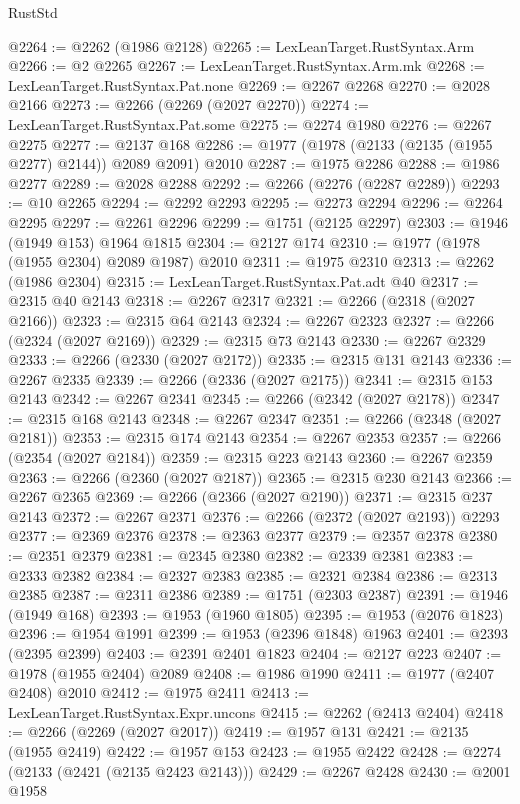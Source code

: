 \begin{lexlean}{RustStd}
\begin{coremodule}
@2264 := @2262 (@1986 @2128)
@2265 := LexLeanTarget.RustSyntax.Arm
@2266 := @2 @2265
@2267 := LexLeanTarget.RustSyntax.Arm.mk
@2268 := LexLeanTarget.RustSyntax.Pat.none
@2269 := @2267 @2268
@2270 := @2028 @2166
@2273 := @2266 (@2269 (@2027 @2270))
@2274 := LexLeanTarget.RustSyntax.Pat.some
@2275 := @2274 @1980
@2276 := @2267 @2275
@2277 := @2137 @168
@2286 := @1977 (@1978 (@2133 (@2135 (@1955 @2277) @2144)) @2089 @2091) @2010
@2287 := @1975 @2286
@2288 := @1986 @2277
@2289 := @2028 @2288
@2292 := @2266 (@2276 (@2287 @2289))
@2293 := @10 @2265
@2294 := @2292 @2293
@2295 := @2273 @2294
@2296 := @2264 @2295
@2297 := @2261 @2296
@2299 := @1751 (@2125 @2297)
@2303 := @1946 (@1949 @153) @1964 @1815
@2304 := @2127 @174
@2310 := @1977 (@1978 (@1955 @2304) @2089 @1987) @2010
@2311 := @1975 @2310
@2313 := @2262 (@1986 @2304)
@2315 := LexLeanTarget.RustSyntax.Pat.adt @40
@2317 := @2315 @40 @2143
@2318 := @2267 @2317
@2321 := @2266 (@2318 (@2027 @2166))
@2323 := @2315 @64 @2143
@2324 := @2267 @2323
@2327 := @2266 (@2324 (@2027 @2169))
@2329 := @2315 @73 @2143
@2330 := @2267 @2329
@2333 := @2266 (@2330 (@2027 @2172))
@2335 := @2315 @131 @2143
@2336 := @2267 @2335
@2339 := @2266 (@2336 (@2027 @2175))
@2341 := @2315 @153 @2143
@2342 := @2267 @2341
@2345 := @2266 (@2342 (@2027 @2178))
@2347 := @2315 @168 @2143
@2348 := @2267 @2347
@2351 := @2266 (@2348 (@2027 @2181))
@2353 := @2315 @174 @2143
@2354 := @2267 @2353
@2357 := @2266 (@2354 (@2027 @2184))
@2359 := @2315 @223 @2143
@2360 := @2267 @2359
@2363 := @2266 (@2360 (@2027 @2187))
@2365 := @2315 @230 @2143
@2366 := @2267 @2365
@2369 := @2266 (@2366 (@2027 @2190))
@2371 := @2315 @237 @2143
@2372 := @2267 @2371
@2376 := @2266 (@2372 (@2027 @2193)) @2293
@2377 := @2369 @2376
@2378 := @2363 @2377
@2379 := @2357 @2378
@2380 := @2351 @2379
@2381 := @2345 @2380
@2382 := @2339 @2381
@2383 := @2333 @2382
@2384 := @2327 @2383
@2385 := @2321 @2384
@2386 := @2313 @2385
@2387 := @2311 @2386
@2389 := @1751 (@2303 @2387)
@2391 := @1946 (@1949 @168)
@2393 := @1953 (@1960 @1805)
@2395 := @1953 (@2076 @1823)
@2396 := @1954 @1991
@2399 := @1953 (@2396 @1848) @1963
@2401 := @2393 (@2395 @2399)
@2403 := @2391 @2401 @1823
@2404 := @2127 @223
@2407 := @1978 (@1955 @2404) @2089
@2408 := @1986 @1990
@2411 := @1977 (@2407 @2408) @2010
@2412 := @1975 @2411
@2413 := LexLeanTarget.RustSyntax.Expr.uncons
@2415 := @2262 (@2413 @2404)
@2418 := @2266 (@2269 (@2027 @2017))
@2419 := @1957 @131
@2421 := @2135 (@1955 @2419)
@2422 := @1957 @153
@2423 := @1955 @2422
@2428 := @2274 (@2133 (@2421 (@2135 @2423 @2143)))
@2429 := @2267 @2428
@2430 := @2001 @1958

\end{coremodule}
\end{lexlean}
